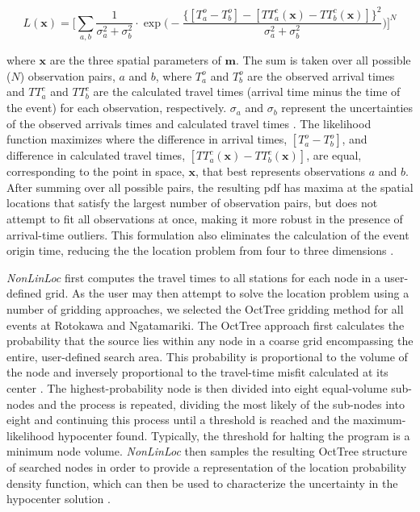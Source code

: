 \begin{equation}\label{likelihood}
    L(\mathbf{x}) = \Bigg[\sum_{a,b}^{}\frac{1}{\sigma_{a}^{2} + \sigma_{b}^{2}} \cdot \exp \Bigg(-\frac{\{[T_{a}^{o} - T_{b}^{o}] - [TT_{a}^{c}(\mathbf{x}) - TT_{b}^{c}(\mathbf{x})]\}^{2}}{\sigma_{a}^{2} + \sigma_{b}^{2}}\Bigg)\Bigg]^{N}
\end{equation}

where $\mathbf{x}$ are the three spatial parameters of $\mathbf{m}$. The sum is taken over all possible ($N$) observation pairs, $a$ and $b$, where $T_{a}^{o}$ and $T_{b}^{o}$ are the observed arrival times and $TT_{a}^{c}$ and $TT_{b}^{c}$ are the calculated travel times (arrival time minus the time of the event) for each observation, respectively. $\sigma_{a}$ and $\sigma_{b}$ represent the uncertainties of the observed arrivals times and calculated travel times \citep{Lomax_2014}. The likelihood function maximizes where the difference in arrival times, $[T_{a}^{o} - T_{b}^{o}]$, and difference in calculated travel times, $[TT_{a}^{c}(\mathbf{x}) - TT_{b}^{c}(\mathbf{x})]$, are equal, corresponding to the point in space, $\mathbf{x}$, that best represents observations $a$ and $b$. After summing over all possible pairs, the resulting \acrshort{pdf} has maxima at the spatial locations that satisfy the largest number of observation pairs, but does not attempt to fit all observations at once, making it more robust in the presence of arrival-time outliers. This formulation also eliminates the calculation of the event origin time, reducing the the location problem from four to three dimensions \citep{Lomax_2014}. 

\textit{NonLinLoc} first computes the travel times to all stations for each node in a user-defined grid. As the user may then attempt to solve the location problem using a number of gridding approaches, we selected the OctTree gridding method for all events at Rotokawa and Ngatamariki. The OctTree approach first calculates the probability that the source lies within any node in a coarse grid encompassing the entire, user-defined search area. This probability is proportional to the volume of the node and inversely proportional to the travel-time misfit calculated at its center \citep{Lomax_2000}. The highest-probability node is then divided into eight equal-volume sub-nodes and the process is repeated, dividing the most likely of the sub-nodes into eight and continuing this process until a threshold is reached and the maximum-likelihood hypocenter found. Typically, the threshold for halting the program is a minimum node volume. \textit{NonLinLoc} then samples the resulting OctTree structure of searched nodes in order to provide a representation of the location probability density function, which can then be used to characterize the uncertainty in the hypocenter solution \citep{Lomax_2000}.

